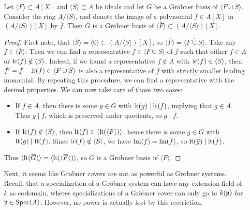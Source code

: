 \begin{lemma}\label{lem:quot_grb}
  Let $\langle F \rangle \subset A[X]$ and $\langle S \rangle \subset A$ be ideals and let $G$ be a Gröbner basis of $\langle F \cup S \rangle$. Consider the ring $A/\langle S \rangle$, and denote the image of a polynomial $f \in A[X]$ in $(A/\langle S \rangle)[X]$ by $\overline f$. Then $\overline G$ is a Gröbner basis of $\langle \overline F \rangle \subset (A/\langle S \rangle)[X]$.
\end{lemma}
\begin{proof}
  First note, that $\langle \overline S \rangle = \langle 0 \rangle \subset (A/\langle S \rangle)[X]$, so $\langle \overline F \rangle = \langle \overline{F \cup S} \rangle$. Take any $\overline f \in \langle \overline F \rangle$. Then we can find a representative $f \in \langle F \cup S \rangle$ of $\overline f$ such that either $f \in A$ or $\operatorname{lc}(f) \notin \langle S \rangle$. Indeed, if we found a representative $f \notin A$ with $\operatorname{lc}(f) \in \langle S \rangle$, then $f' = f - \operatorname{lt}(f) \in \langle F \cup S \rangle$ is also a representative of $\overline f$ with strictly smaller leading monomial. By repeating this procedure, we can find a representative with the desired properties. We can now take care of those two cases:
  \begin{itemize}
    \item If $f \in A$, then there is some $g \in G$ with $\operatorname{lt}(g) \mid \operatorname{lt}(f)$, implying that $g \in A$. Thus $g \mid f$, which is preserved under quotients, so $\overline g \mid \overline f$.
    \item If $\operatorname{lc}(f) \notin \langle S \rangle$, then $\operatorname{lt}(f) \in \langle \operatorname{lt}(\langle F \rangle) \rangle$, hence there is some $g \in G$ with $\operatorname{lt}(g) \mid \operatorname{lt}(f)$. Since $\operatorname{lc}(f) \notin \langle S \rangle$, we have $\operatorname{lm}(f) = \operatorname{lm}(\overline f)$, so $\operatorname{lt}(\overline g) \mid \operatorname{lt}(\overline f)$.
  \end{itemize}
  Thus $\langle \operatorname{lt}(\overline G) \rangle = \langle \operatorname{lt}(\langle \overline F \rangle) \rangle$, so $\overline G$ is a Gröbner basis of $\langle \overline F \rangle$.
\end{proof}

Next, it seems like Gröbner covers are not as powerful as Gröbner systems. Recall, that a specialization of a Gröbner system can have any extension field of $k$ as codomain, wheres specializations of a Gröbner cover can only go to $k(\mathfrak p)$ for $\mathfrak p \in \operatorname{Spec}(A)$. However, no power is actually lost by this restriction.

